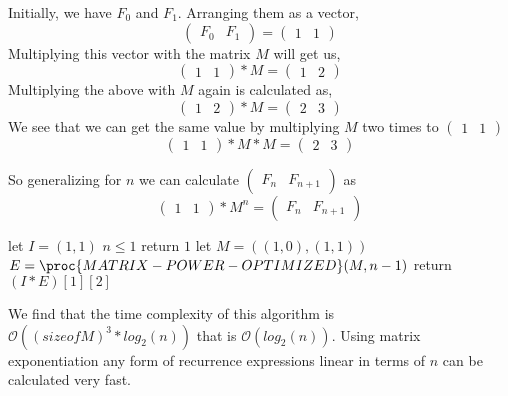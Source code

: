 \documentclass{article}
\begin{document}
Initially, we have $F_0$ and $F_1$. Arranging them as a vector,
$$
\begin{pmatrix}
  F_0 & F_1
\end{pmatrix}
=
\begin{pmatrix}
  1&1
\end{pmatrix}
$$
Multiplying this vector with the matrix $M$ will get us,
$$
\begin{pmatrix}
  1&1
\end{pmatrix}
*M=
\begin{pmatrix}
  1&2
\end{pmatrix}
$$
Multiplying the above with $M$ again is calculated as, 
$$
\begin{pmatrix}
  1&2
\end{pmatrix}
*M=
\begin{pmatrix}
  2&3
\end{pmatrix}
$$
We see that we can get the same value by multiplying $M$ two times to $\begin{pmatrix}
  1&1
\end{pmatrix}$
$$
\begin{pmatrix}
  1&1
\end{pmatrix}
*M*M =
\begin{pmatrix}
  2&3
\end{pmatrix}
$$

So generalizing for $n$ we can calculate $\begin{pmatrix}
  F_n & F_{n+1}
\end{pmatrix}$ as 
$$
\begin{pmatrix}
  1&1
\end{pmatrix}
*M^n=
\begin{pmatrix}
  F_n&F_{n+1}
\end{pmatrix}
$$

\begin{codebox}
\li let $I = (1, 1)$
\li \If $n \leq 1$
\li \Do return $1$\End
\li let $M = ((1, 0), (1, 1))$
\li $E = \proc{MATRIX-POWER-OPTIMIZED}(M, n-1)$
\li return $(I * E)[1][2] $
\end{codebox}

We find that the time complexity of this algorithm is $\mathcal{O}({(size of M)}^3*log_2(n))$ that is $\mathcal{O}(log_2(n))$. Using matrix exponentiation any form of recurrence expressions linear in terms of $n$ can be calculated very fast.
\end{document}
